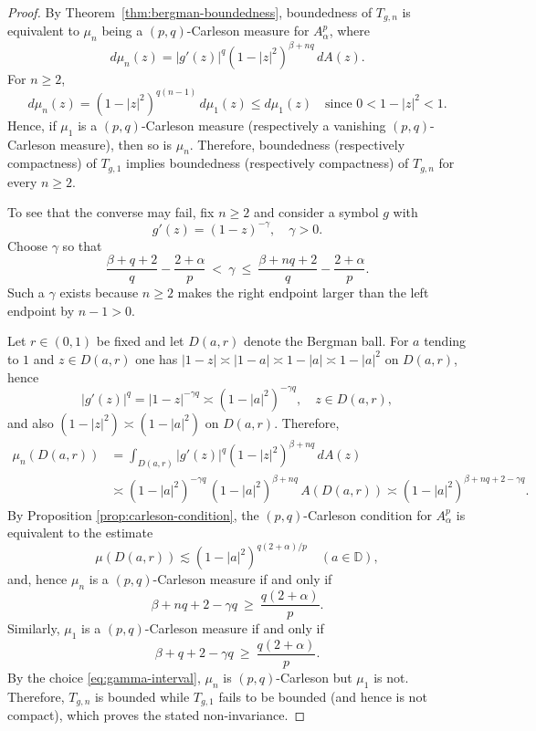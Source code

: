 \documentclass[10pt,a4paper]{amsart}
\begin{document}
\begin{proof}
By Theorem~\ref{thm:bergman-boundedness}, boundedness of $T_{g,n}$ is equivalent to
$\mu_n$ being a $(p,q)$-Carleson measure for $A_\alpha^p$, where
\begin{equation*}
d\mu_n(z)=|g'(z)|^q(1-|z|^2)^{\beta+nq}\,dA(z).
\end{equation*}
For $n\ge2$,
\begin{equation*}
d\mu_n(z)=(1-|z|^2)^{q(n-1)}\,d\mu_1(z)\le d\mu_1(z) \quad \text{since } 0<1-|z|^2<1.
\end{equation*}
Hence, if $\mu_1$ is a $(p,q)$-Carleson measure (respectively a vanishing $(p,q)$-Carleson
measure), then so is $\mu_n$. Therefore, boundedness (respectively compactness) of
$T_{g,1}$ implies boundedness (respectively compactness) of $T_{g,n}$ for every $n\ge2$.

To see that the converse may fail, fix $n\ge2$ and consider a symbol $g$ with
\begin{equation*}
g'(z)=(1-z)^{-\gamma},\quad \gamma>0.
\end{equation*}
Choose $\gamma$ so that
\begin{equation}\label{eq:gamma-interval}
\frac{\beta+q+2}{q}-\frac{2+\alpha}{p}
\ <\ \gamma \ \le\
\frac{\beta+nq+2}{q}-\frac{2+\alpha}{p}.
\end{equation}
Such a $\gamma$ exists because $n\ge2$ makes the right endpoint larger than the left endpoint by $n-1>0$.

Let $r\in(0,1)$ be fixed and let $D(a,r)$ denote the Bergman ball. For $a$ tending to $1$ and $z\in D(a,r)$ one has $|1-z|\asymp |1-a|\asymp 1-|a|\asymp 1-|a|^2$ on $D(a,r)$, hence
\begin{equation*}
|g'(z)|^q = |1-z|^{-\gamma q}\asymp (1-|a|^2)^{-\gamma q},
\quad z\in D(a,r),
\end{equation*}
and also $(1-|z|^2)\asymp (1-|a|^2)$ on $D(a,r)$. Therefore,
\begin{align*}
\mu_n(D(a,r))
&=\int_{D(a,r)} |g'(z)|^q(1-|z|^2)^{\beta+nq}\,dA(z)\\
&\asymp (1-|a|^2)^{-\gamma q}\,(1-|a|^2)^{\beta+nq}\,A(D(a,r))
\asymp (1-|a|^2)^{\beta+nq+2-\gamma q}.
\end{align*}
By Proposition \ref{prop:carleson-condition}, the $(p,q)$-Carleson condition for $A_\alpha^p$ is equivalent to the estimate
\begin{equation*}
\mu(D(a,r))\lesssim (1-|a|^2)^{q(2+\alpha)/p}\quad (a\in\mathbb D),
\end{equation*}
and, hence $\mu_n$ is a $(p,q)$-Carleson measure if and only if
\begin{equation*}
\beta+nq+2-\gamma q \ \ge\ \frac{q(2+\alpha)}{p}.
\end{equation*}
Similarly, $\mu_1$ is a $(p,q)$-Carleson measure if and only if
\begin{equation*}
\beta+q+2-\gamma q \ \ge\ \frac{q(2+\alpha)}{p}.
\end{equation*}
By the choice \eqref{eq:gamma-interval}, $\mu_n$ is $(p,q)$-Carleson but $\mu_1$ is not.
Therefore, $T_{g,n}$ is bounded while $T_{g,1}$ fails to be bounded (and hence is not
compact), which proves the stated non-invariance.


\end{proof}
\end{document}
